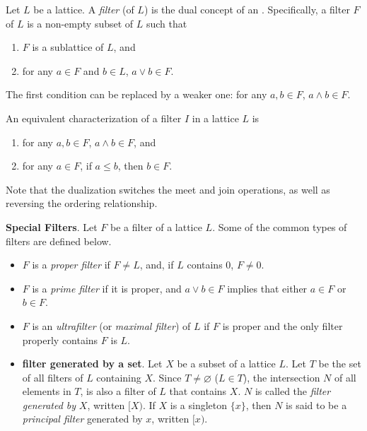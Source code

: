 \documentclass[12pt]{article}
\begin{document}
Let $L$ be a lattice.  A \emph{filter} (of $L$) is the dual concept of an .  Specifically, a filter $F$ of $L$ is a non-empty subset of $L$ such that
\begin{enumerate}
\item $F$ is a sublattice of $L$, and
\item for any $a\in F$ and $b\in L$, $a\vee b\in F$.
\end{enumerate}

The first condition can be replaced by a weaker one: 
for any $a,b\in F$, $a\wedge b\in F$.

An equivalent characterization of a filter $I$ in a lattice $L$ is
\begin{enumerate}
\item for any $a,b\in F$, $a\wedge b\in F$, and
\item for any $a\in F$, if $a\le b$, then $b\in F$.
\end{enumerate}

Note that the dualization switches the meet and join operations, as well as reversing the ordering relationship.

\textbf{Special Filters}. Let $F$ be a filter of a lattice $L$. Some of the common types of filters are defined below.
\begin{itemize}
\item $F$ is a \emph{proper filter} if $F\ne L$, and, if $L$ contains $0$, $F\ne 0$.
\item $F$ is a \emph{prime filter} if it is proper, and $a\vee b\in F$ implies that either $a\in F$ or $b\in F$.
\item $F$ is an \emph{ultrafilter} (or \emph{maximal filter}) of $L$ if $F$ is proper and the only filter properly contains $F$ is $L$.
\item \textbf{filter generated by a set}. Let $X$ be a subset of a lattice $L$. Let $T$ be the set of all filters of $L$ containing $X$. Since $T\ne\varnothing$ ($L\in T$), the intersection $N$ of all elements in $T$, is also a filter of $L$ that contains $X$. $N$ is called the \emph{filter generated by} $X$, written $[X)$. If $X$ is a singleton $\lbrace x\rbrace$, then $N$ is said to be a \emph{principal filter} generated by $x$, written $[x)$.
\end{itemize}
\end{document}

